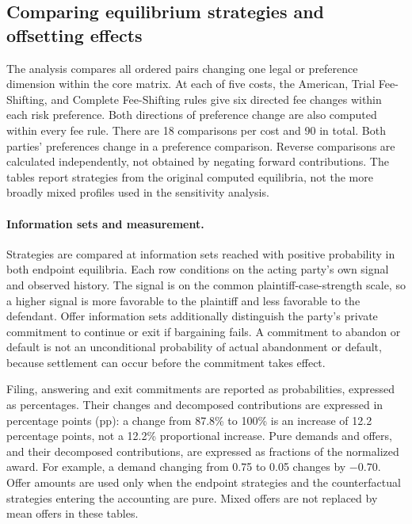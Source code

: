\subsection{Comparing equilibrium strategies and offsetting effects}

The analysis compares all ordered pairs changing one legal or preference dimension
within the core matrix. At each of five costs, the American, Trial Fee-Shifting,
and Complete Fee-Shifting rules give six directed fee changes within each risk
preference. Both directions of preference change are also computed within every
fee rule. There are 18 comparisons per cost and 90 in total. Both parties'
preferences change in a preference comparison. Reverse comparisons are calculated
independently, not obtained by negating forward contributions. The tables report strategies from the original computed equilibria,
not the more broadly mixed profiles used in the sensitivity analysis.

\paragraph{Information sets and measurement.}
Strategies are compared at information sets reached with positive probability
in both endpoint equilibria. Each row conditions on the acting party's own
signal and observed history. The signal is on the common plaintiff-case-strength
scale, so a higher signal is more favorable to the plaintiff and less favorable
to the defendant. Offer information sets additionally distinguish the party's
private commitment to continue or exit if bargaining fails. A commitment to
abandon or default is not an unconditional probability of actual abandonment or
default, because settlement can occur before the commitment takes effect.

Filing, answering and exit commitments are reported as probabilities, expressed
as percentages. Their changes and decomposed contributions are expressed in
percentage points (pp): a change from 87.8\% to 100\% is an increase of
12.2 percentage points, not a 12.2\% proportional increase. Pure demands and
offers, and their decomposed contributions, are expressed as fractions of the
normalized award. For example, a demand changing from 0.75 to 0.05 changes by
$-0.70$. Offer amounts are used only when the endpoint strategies and the
counterfactual strategies entering the accounting are pure. Mixed offers are
not replaced by mean offers in these tables.

